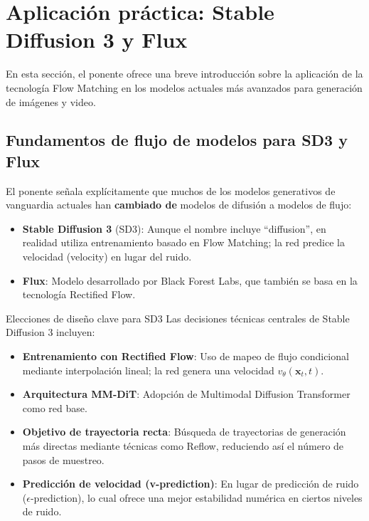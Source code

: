 \section{Aplicación práctica: Stable Diffusion 3 y Flux}

En esta sección, el ponente ofrece una breve introducción sobre la aplicación de la tecnología Flow Matching en los modelos actuales más avanzados para generación de imágenes y video.

\subsection{Fundamentos de flujo de modelos para SD3 y Flux}

El ponente señala explícitamente que muchos de los modelos generativos de vanguardia actuales han \textbf{cambiado de} modelos de difusión a modelos de flujo:

\begin{itemize}
    \item \textbf{Stable Diffusion 3} (SD3): Aunque el nombre incluye ``diffusion'', en realidad utiliza entrenamiento basado en Flow Matching; la red predice la velocidad (velocity) en lugar del ruido.
    \item \textbf{Flux}: Modelo desarrollado por Black Forest Labs, que también se basa en la tecnología Rectified Flow.
\end{itemize}

\begin{importantbox}{Elecciones de diseño clave para SD3}
Las decisiones técnicas centrales de Stable Diffusion 3 incluyen:
\begin{itemize}
    \item \textbf{Entrenamiento con Rectified Flow}: Uso de mapeo de flujo condicional mediante interpolación lineal; la red genera una velocidad $v_\theta(\mathbf{x}_t, t)$.
    \item \textbf{Arquitectura MM-DiT}: Adopción de Multimodal Diffusion Transformer como red base.
    \item \textbf{Objetivo de trayectoria recta}: Búsqueda de trayectorias de generación más directas mediante técnicas como Reflow, reduciendo así el número de pasos de muestreo.
    \item \textbf{Predicción de velocidad (v-prediction)}: En lugar de predicción de ruido ($\epsilon$-prediction), lo cual ofrece una mejor estabilidad numérica en ciertos niveles de ruido.
\end{itemize}
\end{importantbox}


